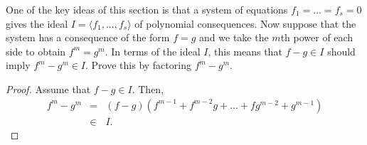 \begin{exercise}{19}
One of the key ideas of this section is that a system of equations $f_1 = ... = f_s = 0$ gives the ideal $I=\langle f_1,...,f_s\rangle$ of polynomial consequences. Now suppose that the system has a consequence of the form $f=g$ and we take the $m$th power of each side to obtain $f^m = g^m$. In terms of the ideal $I$, this means that $f-g\in I$ should imply $f^m - g^m\in I$. Prove this by factoring $f^m - g^m$.    
\end{exercise}
\begin{proof}
    Assume that $f-g\in I$. Then,
    \begin{eqnarray*}
        f^m - g^m
        & = & (f-g)(f^{m-1} + f^{m-2}g + ... + fg^{m-2} + g^{m-1})\\
        & \in & I.
    \end{eqnarray*}
\end{proof}































